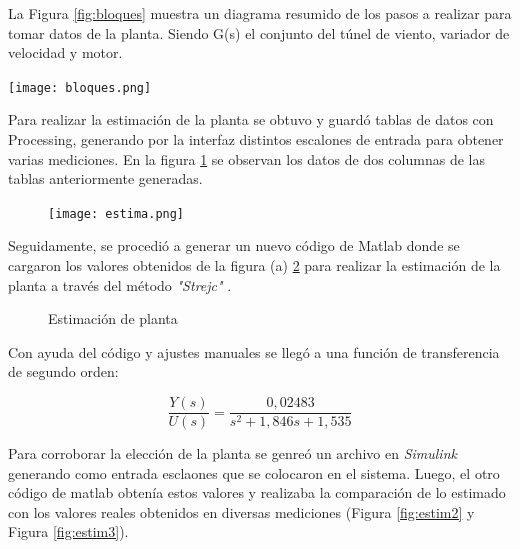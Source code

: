     La Figura \ref{fig:bloques} muestra un diagrama resumido de los pasos a realizar para tomar datos de la planta. Siendo G(s) el conjunto del túnel de viento, variador de velocidad y motor.
 
    \begin{center}
    	\texttt{[image: bloques.png]}
    	\label{fig:bloques}    
    \end{center}
    
    Para realizar la estimación de la planta se obtuvo y guardó tablas de datos con Processing, generando por la interfaz distintos escalones de entrada para obtener varias mediciones. En la figura \ref{fig:est2} se observan los datos de dos columnas de las tablas anteriormente generadas.
    
    \begin{figure}[htb]
    	\centering
    	\texttt{[image: estima.png]} %
    	\label{fig:est2}    
    \end{figure}
    
    Seguidamente, se procedió a generar un nuevo código de Matlab donde se cargaron los valores obtenidos de la figura (a) \ref{fig:pl2} para realizar la estimación de la planta a través del método \textit{"Strejc"} \cite{pomares2011sistemas}.
    
    \begin{figure}[htbp]
    	\centering
    	\caption{Estimación de planta} \label{fig:pl2}
    \end{figure}
    
    Con ayuda del código y ajustes manuales se llegó a una función de transferencia de segundo orden:
    
    \begin{equation}
    	\frac{Y(s)}{U(s)}=\frac{0,02483}{s^2+1,846s+1,535}
    \end{equation}
    
    Para corroborar la elección de la planta se genreó un archivo en \textit{Simulink} generando como entrada esclaones que se colocaron en el sistema. Luego, el otro código de matlab obtenía estos valores y realizaba la comparación de lo estimado con los valores reales obtenidos en diversas mediciones (Figura \ref{fig:estim2} y Figura \ref{fig:estim3}).
    
